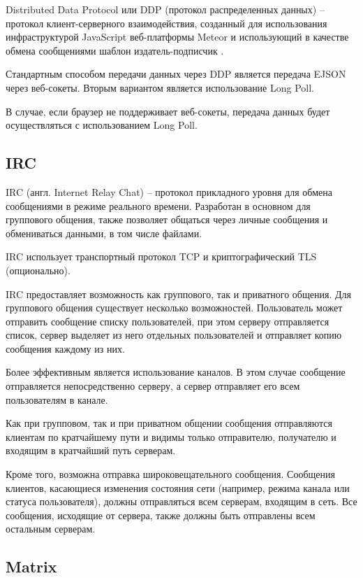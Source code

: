 Distributed Data Protocol или DDP \cite{ddp} (протокол распределенных данных) -- протокол клиент-серверного взаимодействия, созданный для использования инфраструктурой JavaScript веб-платформы Meteor и использующий в качестве обмена сообщениями шаблон издатель-подписчик \cite{pubsub}.

Стандартным способом передачи данных через DDP является передача EJSON через веб-сокеты. Вторым вариантом является использование Long Poll.

В случае, если браузер не поддерживает веб-сокеты, передача данных будет осуществляться с использованием Long Poll.

\subsection{IRC}

IRC \cite{irc} (англ. Internet Relay Chat) -- протокол прикладного уровня для обмена сообщениями в режиме реального времени. Разработан в основном для группового общения, также позволяет общаться через личные сообщения и обмениваться данными, в том числе файлами.

IRC использует транспортный протокол TCP и криптографический TLS (опционально).

IRC предоставляет возможность как группового, так и приватного общения. Для группового общения существует несколько возможностей. Пользователь может отправить сообщение списку пользователей, при этом серверу отправляется список, сервер выделяет из него отдельных пользователей и отправляет копию сообщения каждому из них.

Более эффективным является использование каналов. В этом случае сообщение отправляется непосредственно серверу, а сервер отправляет его всем пользователям в канале.

Как при групповом, так и при приватном общении сообщения отправляются клиентам по кратчайшему пути и видимы только отправителю, получателю и входящим в кратчайший путь серверам.

Кроме того, возможна отправка широковещательного сообщения. Сообщения клиентов, касающиеся изменения состояния сети (например, режима канала или статуса пользователя), должны отправляться всем серверам, входящим в сеть. Все сообщения, исходящие от сервера, также должны быть отправлены всем остальным серверам.

\subsection{Matrix}

